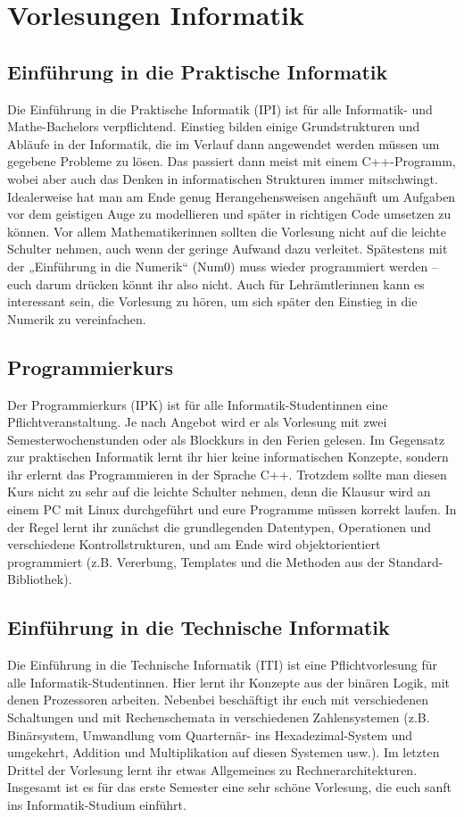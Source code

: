 \section*{Vorlesungen Informatik}

\subsection{Einführung in die Praktische Informatik}
\label{info1}
Die Einführung in die Praktische Informatik (\gls{IPI}) ist für alle Informatik- und Mathe-Bachelors verpflichtend. Einstieg bilden einige Grundstrukturen und Abläufe in der Informatik, die im Verlauf dann angewendet werden müssen um gegebene Probleme zu lösen. Das passiert dann meist mit einem C++-Programm, wobei aber auch das Denken in informatischen Strukturen immer mitschwingt. Idealerweise hat man am Ende genug Herangehensweisen angehäuft um Aufgaben vor dem geistigen Auge zu modellieren und später in richtigen Code umsetzen zu können. Vor allem Mathematikerinnen sollten die Vorlesung nicht auf die leichte Schulter nehmen, auch wenn der geringe Aufwand dazu verleitet. Spätestens mit der „Einführung in die Numerik“ (\gls{Num0}) muss wieder programmiert werden -- euch darum drücken könnt ihr also nicht. Auch für Lehrämtlerinnen kann es interessant sein, die Vorlesung zu hören, um sich später den Einstieg in die Numerik zu vereinfachen.

\subsection{Programmierkurs}
\label{ipk}
Der Programmierkurs (\gls{IPK}) ist für alle Informatik-Studentinnen eine Pflichtveranstaltung. Je nach Angebot wird er als Vorlesung mit zwei Semesterwochenstunden oder als Blockkurs in den Ferien gelesen. Im Gegensatz zur praktischen Informatik lernt ihr hier keine informatischen Konzepte, sondern ihr erlernt das Programmieren in der Sprache C++. Trotzdem sollte man diesen Kurs nicht zu sehr auf die leichte Schulter nehmen, denn die Klausur wird an einem PC mit Linux durchgeführt und eure Programme müssen korrekt laufen. In der Regel lernt ihr zunächst die grundlegenden Datentypen, Operationen und verschiedene Kontrollstrukturen, und am Ende wird objektorientiert programmiert (z.B. Vererbung, Templates und die Methoden aus der Standard-Bibliothek).

\subsection{Einführung in die Technische Informatik}
\label{info2}
Die Einführung in die Technische Informatik (\gls{ITI}) ist eine Pflichtvorlesung für alle Informatik-Studentinnen. Hier lernt ihr Konzepte aus der binären Logik, mit denen Prozessoren arbeiten. Nebenbei beschäftigt ihr euch mit verschiedenen Schaltungen und mit Rechenschemata in verschiedenen Zahlensystemen (z.B. Binärsystem, Umwandlung vom Quarternär- ins Hexadezimal-System und umgekehrt, Addition und Multiplikation auf diesen Systemen usw.). Im letzten Drittel der Vorlesung lernt ihr etwas Allgemeines zu Rechnerarchitekturen. Insgesamt ist es für das erste Semester eine sehr schöne Vorlesung, die euch sanft ins Informatik-Studium einführt.


